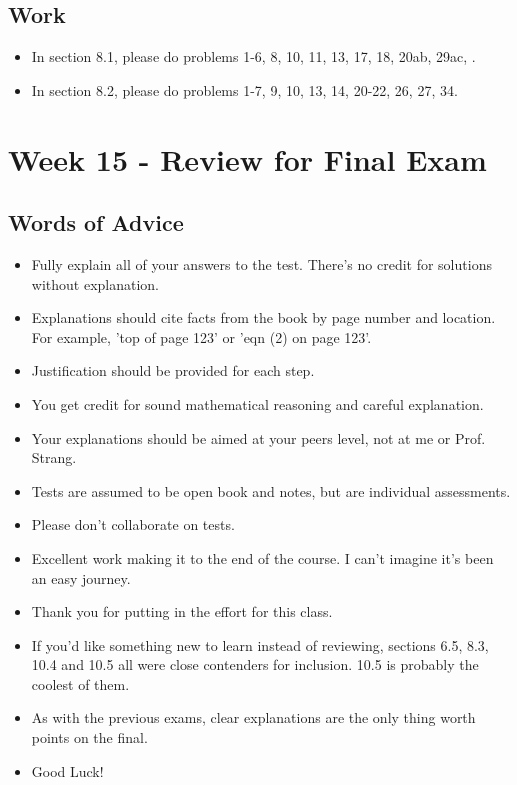 	\subsection{Work}
		\begin{itemize}
			\item In section 8.1, please do problems 1-6, 8, 10, 11, 13, 17, 18, 20ab, 29ac, .
			\item In section 8.2, please do problems 1-7, 9, 10, 13, 14, 20-22, 26, 27, 34.
		\end{itemize}

	\clearpage



	\section{Week 15 - Review for Final Exam}

	\subsection{Words of Advice}
		\begin{itemize}
			\item Fully explain all of your answers to the test. There's no credit for solutions without explanation.
			\item Explanations should cite facts from the book by page number and location. For example, 'top of page 123' or 'eqn (2) on page 123'.
			\item Justification should be provided for each step.
			\item You get credit for sound mathematical reasoning and careful explanation.
			\item Your explanations should be aimed at your peers level, not at me or Prof. Strang.
			\item Tests are assumed to be open book and notes, but are individual assessments.
			\item Please don't collaborate on tests.
			\item Excellent work making it to the end of the course. I can't imagine it's been an easy journey.
			\item Thank you for putting in the effort for this class.
			\item If you'd like something new to learn instead of reviewing, sections 6.5, 8.3, 10.4 and 10.5 all were close contenders for inclusion. 10.5 is probably the coolest of them.
			\item As with the previous exams, clear explanations are the only thing worth points on the final.
			\item Good Luck!
		\end{itemize}

	\clearpage


